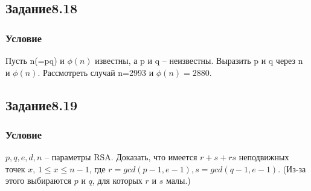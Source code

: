 \documentclass[10pt,a4paper]{article}
\begin{document}
\subsection*{Задание8.18}
\subsubsection*{Условие}
Пусть n(=pq) и $\phi(n)$ известны, а p и q -- неизвестны. Выразить p и
q через n и $\phi(n)$. Рассмотреть случай n=2993 и $\phi(n)=2880$.

\subsection*{Задание8.19}
\subsubsection*{Условие}
$p,q,e,d,n$ -- параметры RSA.  Доказать, что имеется $r+s+rs$
неподвижных точек $x$, $1\leq x\leq n-1$, где $r=gcd(p-1,e-1),
s=gcd(q-1,e-1)$. (Из-за этого выбираются $p$ и $q$, для которых $r$ и
$s$ малы.) 
\end{document}
